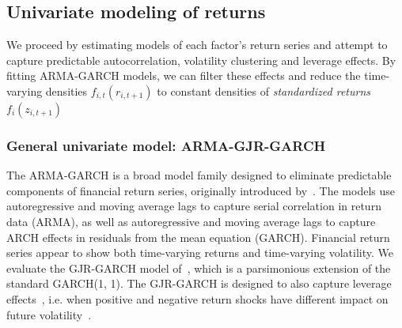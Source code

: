 
\subsection{Univariate modeling of returns} %
\label{sub:univariate_modeling_of_returns}

We proceed by estimating models of each factor's return series and attempt to capture predictable autocorrelation, volatility clustering and leverage effects. By fitting ARMA-GARCH models, we can filter these effects and reduce the time-varying densities $f_{i,t}(r_{i,t+1})$ to constant densities of \emph{standardized returns} $f_{i}(z_{i,t+1})$

\subsubsection{General univariate model: ARMA-GJR-GARCH}

The ARMA-GARCH is a broad model family designed to eliminate predictable components of financial return series, originally introduced by~\textcite{Bollerslev1986}. The models use autoregressive and moving average lags to capture serial correlation in return data (ARMA), as well as autoregressive and moving average lags to capture ARCH effects in residuals from the mean equation (GARCH). Financial return series appear to show both time-varying returns and time-varying volatility. We evaluate the GJR-GARCH model of~\textcite{glosten1993relation}, which is a parsimonious extension of the standard GARCH(1, 1). The GJR-GARCH is designed to also capture leverage effects~\autocite{glosten1993relation}, i.e. when positive and negative return shocks have different impact on future volatility~\autocite{Black1976}.

